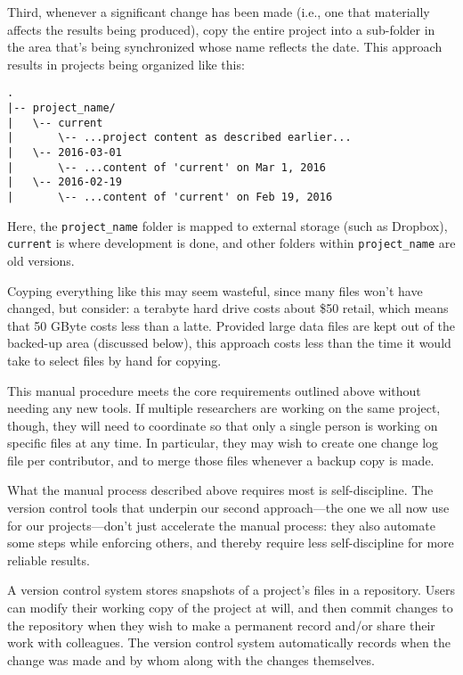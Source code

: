 \documentclass[10pt]{article}
\begin{document}
Third, whenever a significant change has been made (i.e., one that
materially affects the results being produced), copy the entire project
into a sub-folder in the area that's being synchronized whose name
reflects the date. This approach results in projects being organized
like this:

\begin{verbatim}
.
|-- project_name/
|   \-- current
|       \-- ...project content as described earlier...
|   \-- 2016-03-01
|       \-- ...content of 'current' on Mar 1, 2016
|   \-- 2016-02-19
|       \-- ...content of 'current' on Feb 19, 2016
\end{verbatim}

Here, the \texttt{project\_name} folder is mapped to external storage
(such as Dropbox), \texttt{current} is where development is done, and
other folders within \texttt{project\_name} are old versions.

Coyping everything like this may seem wasteful, since many files won't
have changed, but consider: a terabyte hard drive costs about \$50
retail, which means that 50 GByte costs less than a latte. Provided
large data files are kept out of the backed-up area (discussed below),
this approach costs less than the time it would take to select files by
hand for copying.

This manual procedure meets the core requirements outlined above without
needing any new tools. If multiple researchers are working on the same
project, though, they will need to coordinate so that only a single
person is working on specific files at any time. In particular, they may
wish to create one change log file per contributor, and to merge those
files whenever a backup copy is made.

What the manual process described above requires most is
self-discipline. The version control tools that underpin our second
approach---the one we all now use for our projects---don't just
accelerate the manual process: they also automate some steps while
enforcing others, and thereby require less self-discipline for more
reliable results.

A version control system stores snapshots of a project's files in a
repository. Users can modify their working copy of the project at will,
and then commit changes to the repository when they wish to make a
permanent record and/or share their work with colleagues. The version
control system automatically records when the change was made and by
whom along with the changes themselves.
\end{document}
